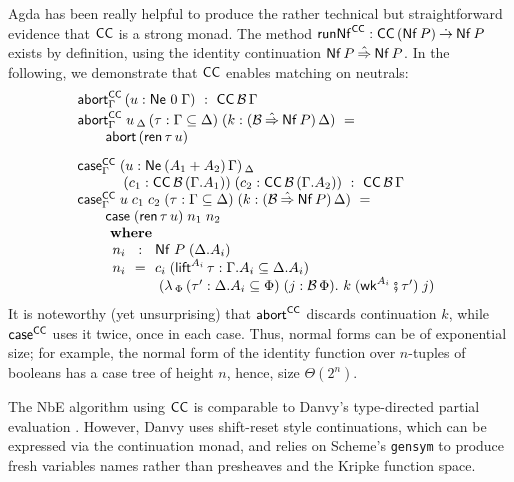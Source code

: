 \documentclass[sigconf,screen,fleqn]{acmart} %
\begin{document}
Agda has been really helpful to produce the rather technical but
straightforward evidence that $\CC$ is a strong monad.
The method $\trunNf[\CC] : \CC\,(\tNf\,P) \todot \tNf\,P$
exists by definition, using the identity continuation $\tNf\,P \hatto \tNf\,P$.
In the following, we demonstrate that $\CC$
enables matching on neutrals:
\[
\renewcommand{\left}{}
\renewcommand{\right}{}
\begin{array}{l}
  \tabort^{\CC}_\Gamma \, (u : \Ne \tyzero \Gamma) ~:~  \CC\,\B\,\Gamma \\[0.4ex]
  \tabort^{\CC}_\Gamma
    \; u
    \, _\Delta
    \, (\tau : \Gamma \sublist \Delta)
    \; (k : (\B \hatto \tNf\,P)\,\Delta)
     ~=~ \\  \qquad
    \tabort\,(\tren\,\tau\,u)
\\[2ex]
  \tcase^{\CC}_\Gamma
     \; (u : \NeP {A_1 + A_2} \Gamma) \, _\Delta \\ \qquad \quad
     \; (c_1 : \CC\,\B\,(\cext \Gamma {A_1}))
     \; (c_2 : \CC\,\B\,(\cext \Gamma {A_2}))
    ~:~ \CC\,\B\,\Gamma \\
  \tcase^{\CC}_\Gamma
    \; u
    \; c_1
    \; c_2
    \; (\tau : \Gamma \sublist \Delta)
    \; (k : (\B \hatto \tNf\,P)\,\Delta)
     ~=~ \\  \qquad
    \tcase\;(\tren\,\tau\,u)\;n_1\;n_2
    \\ \qquad \bwhere \\
\qquad
  \begin{array}{l@{~~}c@{~~}l}
     n_i & : & \Nf P {(\cext \Delta {A_i})} \\
     n_i & = & c_i
      \; (\tlift^{A_i}\,\tau
            : \cext \Gamma {A_i} \sublist \cext \Delta {A_i})
\\ &&
      \; \left(\lambda
            \, _\Phi
            \, (\tau' : \cext \Delta {A_i} \sublist \Phi)
            \; (j :  \B\,\Phi) .
            \ k
            \; (\twk^{A_i} \rcomp \tau')
            \; j
         \right)
  \end{array}
\end{array}
\]
It is noteworthy (yet unsurprising) that $\tabort^\CC$ discards continuation $k$, while
$\tcase^\CC$ uses it twice, once in each case.  Thus, normal forms can
be of exponential size; for example, the normal form of the identity
function over $n$-tuples of booleans has a case tree of height $n$,
hence, size $\Theta(2^n)$.

The NbE algorithm using $\CC$ is comparable to Danvy's type-directed
partial evaluation \cite[Figure~8]{danvy:popl96}.  However, Danvy uses
shift-reset style continuations, which can be expressed via the
continuation monad, and relies on Scheme's \texttt{gensym} to produce
fresh variables names rather than presheaves and the Kripke function space.
\end{document}
